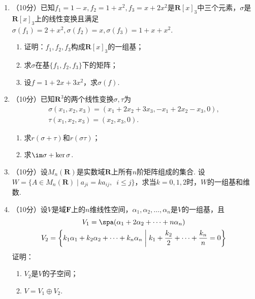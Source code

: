 \begin{enumerate}
    \item （10分）已知$f_1=1-x,f_2=1+x^2,f_3=x+2x^2$是$\mathbf{R}[x]_3$中三个元素，$\sigma$是$\mathbf{R}[x]_3$上的线性变换且满足$\sigma(f_1)=2+x^2,\sigma(f_2)=x,\sigma(f_3)=1+x+x^2$.
    \begin{enumerate}
        \item 证明：$f_1,f_2,f_3$构成$\mathbf{R}[x]_3$的一组基；

        \item 求$\sigma$在基$\{f_1,f_2,f_3\}$下的矩阵；

        \item 设$f=1+2x+3x^2$，求$\sigma(f)$.
    \end{enumerate}

    \item （10分）已知$\mathbf{R}^3$的两个线性变换$\sigma,\tau$为
    \begin{gather*}
           \sigma(x_1,x_2,x_3)=(x_1+2x_2+3x_3,-x_1+2x_2-x_3,0), \\
           \tau(x_1,x_2,x_3)=(x_2,x_3,0).
    \end{gather*}
    \begin{enumerate}
        \item 求$r(\sigma+\tau)$和$r(\sigma\tau)$；

        \item 求$\im\sigma+\ker\sigma$.
    \end{enumerate}

    \item （10分）设$M_n(\mathbf{R})$是实数域$\mathbf{R}$上所有$n$阶矩阵组成的集合. 设$W=\{A\in M_n(\mathbf{R})\mid a_{ji}=ka_{ij},\enspace i\leqslant j\}$，求当$k=0,1,2$时，$W$的一组基和维数.

    \item （10分）设$V$是域$\mathbf{F}$上的$n$维线性空间，$\alpha_1,\alpha_2,\ldots,\alpha_n$是$V$的一组基，且
    \begin{gather*}
        V_1=\spa(\alpha_1+2\alpha_2+\cdots+n\alpha_n) \\
        V_2=\left\{k_1\alpha_1+k_2\alpha_2+\cdots+k_n\alpha_n \;\middle|\; k_1+\frac{k_2}{2}+\cdots+\frac{k_n}{n}=0\right\}
    \end{gather*}
    证明：
    \begin{enumerate}
        \item $V_2$是$V$的子空间；

        \item $V=V_1\oplus V_2$.
    \end{enumerate}


\end{enumerate}
